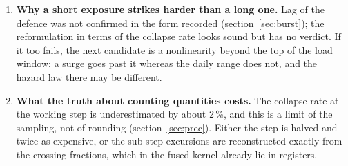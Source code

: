 \begin{enumerate}
\item \textbf{Why a short exposure strikes harder than a long one.} Lag of the defence was not confirmed in the form recorded (section~\ref{sec:burst}); the reformulation in terms of the collapse rate looks sound but has no verdict. If it too fails, the next candidate is a nonlinearity beyond the top of the load window: a surge goes past it whereas the daily range does not, and the hazard law there may be different.
\item \textbf{What the truth about counting quantities costs.} The collapse rate at the working step is underestimated by about 2\,\%, and this is a limit of the sampling, not of rounding (section~\ref{sec:prec}). Either the step is halved and twice as expensive, or the sub-step excursions are reconstructed exactly from the crossing fractions, which in the fused kernel already lie in registers.
\end{enumerate}
